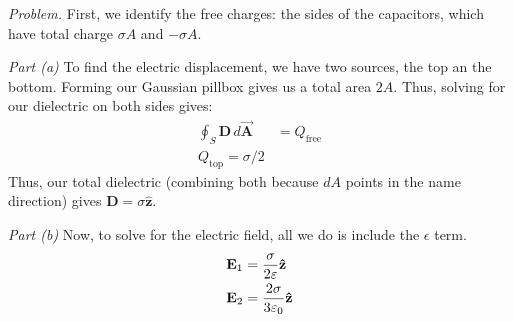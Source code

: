 \documentclass[10pt,oneside]{book}
\newcommand{\gspc}{\vspace{0.13cm}} %
\newcommand{\gline}[0]{\gspc\\} %
\newenvironment{problem}[1]
  {\vspace{-0.1cm}\begin{tcolorbox}[problembox]
   \textit{Problem. }#1}
  {\end{tcolorbox}\gspc}
\newenvironment{subproblem}[2]
  {\vspace{-0.1cm}\begin{tcolorbox}[subproblembox]
   \textit{#1 }#2}
  {\end{tcolorbox}\gspc}
\newcommand{\vA}{\vec{\mathbf{A}}}
\newcommand{\unit}[1]{\mathbf{\hat{#1}}}
\begin{document}
\begin{problem}
  First, we identify the free charges: the sides of the capacitors, which have total charge $\sigma A$ and $-\sigma A$. 
  \begin{subproblem}{Part (a)}
    To find the electric displacement, we have two sources, the top an the bottom. Forming our Gaussian pillbox gives us a total area $2A$. Thus, solving for our dielectric on both sides gives:
    \begin{align*}
      \oint_S \mathbf D \, d\vA &= Q_\text{free}\\
      Q_\text{top} = \sigma/2
    \end{align*}
    Thus, our total dielectric (combining both because $dA$ points in the name direction) gives $\mathbf D = \sigma\unit{z}$.\gline{}
  \end{subproblem}

  \begin{subproblem}{Part (b)}
    Now, to solve for the electric field, all we do is include the $\epsilon$ term.
    \begin{align*}
      \vE_\text{1} &= \frac{\sigma}{2\varepsilon}\unit{z}\\
      \vE_\text{2} &= \frac{2\sigma}{3\varepsilon_0}\unit{z}
    \end{align*}
  \end{subproblem}


\end{problem}
\end{document}
